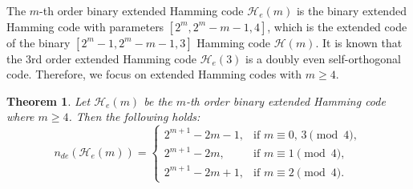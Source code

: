 \documentclass{article}
\newtheorem{theorem}{Theorem}[section]
\theoremstyle{definition}
\theoremstyle{remark}
\begin{document}
The $m$-th order binary extended Hamming code $\mathcal{H}_e(m)$ is the binary extended Hamming code with parameters $[2^m, 2^{m}-m-1, 4]$, which is the extended code of the binary $[2^m-1, 2^m-m-1, 3]$ Hamming code $\mathcal{H}(m)$. It is known that the $3$rd order extended Hamming code $\mathcal{H}_e(3)$ is a doubly even self-orthogonal code. Therefore, we focus on extended Hamming codes with $m\ge 4$.
\begin{theorem}\label{DoublyevenHamming}
    Let $\mathcal{H}_e(m)$ be the $m$-th order binary extended Hamming code where $m\ge 4$. Then the following holds:
\[
n_{de}(\mathcal{H}_e(m))=
\begin{cases}
2^{m+1}-2m-1, & \text{if } m\equiv0,\,3\pmod4,\\
2^{m+1}-2m, & \text{if } m\equiv1\pmod4,\\
2^{m+1}-2m+1, & \text{if } m\equiv2\pmod4.
\end{cases}
\]
\end{theorem}
\end{document}
